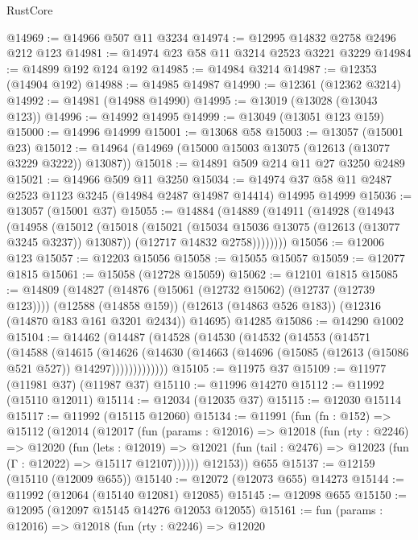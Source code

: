\begin{lexlean}{RustCore}
\begin{coremodule}
@14969 := @14966 @507 @11 @3234
@14974 := @12995 @14832 @2758 @2496 @212 @123
@14981 := @14974 @23 @58 @11 @3214 @2523 @3221 @3229
@14984 := @14899 @192 @124 @192
@14985 := @14984 @3214
@14987 := @12353 (@14904 @192)
@14988 := @14985 @14987
@14990 := @12361 (@12362 @3214)
@14992 := @14981 (@14988 @14990)
@14995 := @13019 (@13028 (@13043 @123))
@14996 := @14992 @14995
@14999 := @13049 (@13051 @123 @159)
@15000 := @14996 @14999
@15001 := @13068 @58
@15003 := @13057 (@15001 @23)
@15012 := @14964 (@14969 (@15000 @15003 @13075 (@12613 (@13077 @3229 @3222)) @13087))
@15018 := @14891 @509 @214 @11 @27 @3250 @2489
@15021 := @14966 @509 @11 @3250
@15034 := @14974 @37 @58 @11 @2487 @2523 @1123 @3245 (@14984 @2487 @14987 @14414) @14995 @14999
@15036 := @13057 (@15001 @37)
@15055 := @14884
    (@14889
      (@14911
        (@14928
          (@14943
            (@14958
              (@15012
                (@15018
                  (@15021 (@15034 @15036 @13075 (@12613 (@13077 @3245 @3237)) @13087))
                  (@12717 @14832 @2758))))))))
@15056 := @12006 @123
@15057 := @12203 @15056
@15058 := @15055 @15057
@15059 := @12077 @1815
@15061 := @15058 (@12728 @15059)
@15062 := @12101 @1815
@15085 := @14809
    (@14827
      (@14876 (@15061 (@12732 @15062) (@12737 (@12739 @123))))
      (@12588 (@14858 @159))
      (@12613 (@14863 @526 @183))
      (@12316 (@14870 @183 @161 @3201 @2434))
      @14695)
    @14285
@15086 := @14290 @1002
@15104 := @14462
    (@14487
      (@14528
        (@14530
          (@14532
            (@14553
              (@14571
                (@14588
                  (@14615
                    (@14626
                      (@14630
                        (@14663 (@14696 (@15085 (@12613 (@15086 @521 @527)) @14297)))))))))))))
@15105 := @11975 @37
@15109 := @11977 (@11981 @37) (@11987 @37)
@15110 := @11996 @14270
@15112 := @11992 (@15110 @12011)
@15114 := @12034 (@12035 @37)
@15115 := @12030 @15114
@15117 := @11992 (@15115 @12060)
@15134 := @11991
    (fun (fn : @152) =>
    @15112
      (@12014
        (@12017
          (fun (params : @12016) =>
          @12018
            (fun (rty : @2246) =>
            @12020
              (fun (lets : @12019) =>
              @12021 (fun (tail : @2476) => @12023 (fun (Γ : @12022) => @15117 @12107))))))
        @12153))
    @655
@15137 := @12159 (@15110 (@12009 @655))
@15140 := @12072 (@12073 @655) @14273
@15144 := @11992 (@12064 (@15140 @12081) @12085)
@15145 := @12098 @655
@15150 := @12095 (@12097 @15145 @14276 @12053 @12055)
@15161 := fun (params : @12016) =>
  @12018
    (fun (rty : @2246) =>
    @12020

\end{coremodule}
\end{lexlean}
